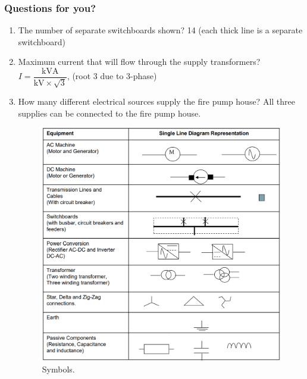 \documentclass[class=report, crop=false, 12pt,a4paper]{standalone}
\begin{document}
\subsubsection{Questions for you?}
\begin{enumerate}
	\item The number of separate switchboards shown? 14 (each thick line is a separate switchboard)
	\item Maximum current that will flow through the supply transformers? $I = \dfrac{\si{\kilo\volt\ampere}}{\si{\kilo\volt} \times \sqrt{3}}$, (root 3 due to 3-phase)
	\item How many different electrical sources supply the fire pump house? All three supplies can be connected to the fire pump house.
\begin{figure}[H]
	\centering
	\includegraphics[width = \textwidth]{../img/figure3.png}
	\caption{Symbols.}
\end{figure}
\end{enumerate}
\end{document}
